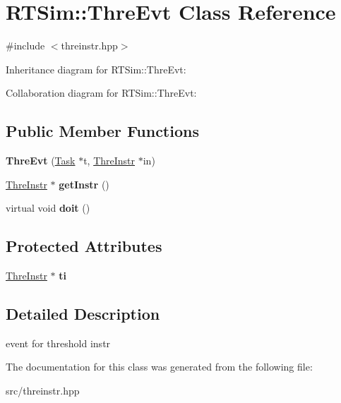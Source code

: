 \hypertarget{classRTSim_1_1ThreEvt}{}\section{R\+T\+Sim\+:\+:Thre\+Evt Class Reference}
\label{classRTSim_1_1ThreEvt}


{\ttfamily \#include $<$threinstr.\+hpp$>$}



Inheritance diagram for R\+T\+Sim\+:\+:Thre\+Evt\+:


Collaboration diagram for R\+T\+Sim\+:\+:Thre\+Evt\+:
\subsection*{Public Member Functions}
\begin{DoxyCompactItemize}
\item 
{\bfseries Thre\+Evt} (\hyperlink{classRTSim_1_1Task}{Task} $\ast$t, \hyperlink{classRTSim_1_1ThreInstr}{Thre\+Instr} $\ast$in)\hypertarget{classRTSim_1_1ThreEvt_a92cf0ec7fb37b5184af69a1880f53689}{}\label{classRTSim_1_1ThreEvt_a92cf0ec7fb37b5184af69a1880f53689}

\item 
\hyperlink{classRTSim_1_1ThreInstr}{Thre\+Instr} $\ast$ {\bfseries get\+Instr} ()\hypertarget{classRTSim_1_1ThreEvt_a43a1d3e91647762fed7e328d5747c1f9}{}\label{classRTSim_1_1ThreEvt_a43a1d3e91647762fed7e328d5747c1f9}

\item 
virtual void {\bfseries doit} ()\hypertarget{classRTSim_1_1ThreEvt_a3928147c70ba89891a012b41f27344cd}{}\label{classRTSim_1_1ThreEvt_a3928147c70ba89891a012b41f27344cd}

\end{DoxyCompactItemize}
\subsection*{Protected Attributes}
\begin{DoxyCompactItemize}
\item 
\hyperlink{classRTSim_1_1ThreInstr}{Thre\+Instr} $\ast$ {\bfseries ti}\hypertarget{classRTSim_1_1ThreEvt_a3a8c159461c83e54571a227feca36a4b}{}\label{classRTSim_1_1ThreEvt_a3a8c159461c83e54571a227feca36a4b}

\end{DoxyCompactItemize}


\subsection{Detailed Description}
event for threshold instr 

The documentation for this class was generated from the following file\+:\begin{DoxyCompactItemize}
\item 
src/threinstr.\+hpp\end{DoxyCompactItemize}
